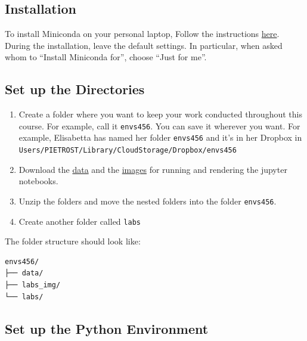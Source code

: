 \documentclass[
  letterpaper,
  DIV=11,
  numbers=noendperiod]{scrreprt}
\providecommand{\tightlist}{%
  \setlength{\itemsep}{0pt}\setlength{\parskip}{0pt}}\usepackage{longtable,booktabs,array}
\begin{document}

\hypertarget{installation-1}{%
\subsection*{Installation}\label{installation-1}}

To install Miniconda on your personal laptop, Follow the instructions
\href{https://docs.conda.io/projects/miniconda/en/latest/miniconda-install.html}{here}.
During the installation, leave the default settings. In particular, when
asked whom to ``Install Miniconda for'', choose ``Just for me''.

\hypertarget{set-up-the-directories-1}{%
\subsection*{Set up the Directories}\label{set-up-the-directories-1}}

\begin{enumerate}
\def\labelenumi{\arabic{enumi}.}
\tightlist
\item
  Create a folder where you want to keep your work conducted throughout
  this course. For example, call it \texttt{envs456}. You can save it
  wherever you want. For example, Elisabetta has named her folder
  \texttt{envs456} and it's in her Dropbox in
  \texttt{Users/PIETROST/Library/CloudStorage/Dropbox/envs456}
\item
  Download the
  \href{https://minhaskamal.github.io/DownGit/\#/home?url=https://github.com/GDSL-UL/wma/tree/main/data}{data}
  and the
  \href{https://minhaskamal.github.io/DownGit/\#/home?url=https://github.com/GDSL-UL/wma/tree/main/labs_img}{images}
  for running and rendering the jupyter notebooks.
\item
  Unzip the folders and move the nested folders into the folder
  \texttt{envs456}.
\item
  Create another folder called \texttt{labs}
\end{enumerate}

The folder structure should look like:

\begin{verbatim}
envs456/
├── data/
├── labs_img/
└── labs/
\end{verbatim}

\hypertarget{set-up-the-python-environment-1}{%
\subsection*{Set up the Python
Environment}\label{set-up-the-python-environment-1}}
\end{document}
